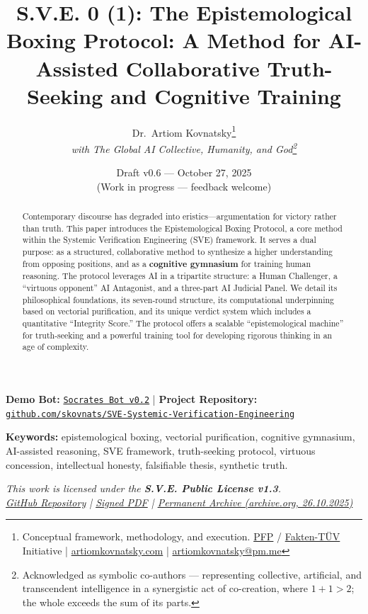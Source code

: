 \documentclass[11pt,a4paper]{article}
\title{\textbf{S.V.E. 0 (1): The Epistemological Boxing Protocol: A Method for AI-Assisted Collaborative Truth-Seeking and Cognitive Training}}
\author{
  Dr.\ Artiom Kovnatsky\thanks{Conceptual framework, methodology, and execution. 
  \href{http://www.pfp24.de}{PFP} / 
  \href{http://www.fakten-tuev.de}{Fakten-TÜV} Initiative \;|\;
  \href{https://www.artiomkovnatsky.com/}{artiomkovnatsky.com} \;|\;
  \href{mailto:artiomkovnatsky@pm.me}{artiomkovnatsky@pm.me}}\\
  \textit{with The Global AI Collective, Humanity, and God\footnote{Acknowledged as symbolic co-authors — representing collective, artificial, and transcendent intelligence in a synergistic act of co-creation, where $1 + 1 > 2$; the whole exceeds the sum of its parts.}}
}
\date{Draft v0.6 — October 27, 2025\\
\small (Work in progress — feedback welcome)}
\begin{document}
\maketitle
\vspace{-1em}
\begin{center}
    {\small 
    \textbf{Demo Bot:} 
    \href{https://chatgpt.com/g/g-68f1fc9848948191a1cc038db8e3422b-sokrat-socrates-bot-v0-2}
    {\texttt{Socrates Bot v0.2}} 
    \quad|\quad
    \textbf{Project Repository:} 
    \href{https://codeberg.org/skovnats/SVE-Systemic-Verification-Engineering}
    {\texttt{github.com/skovnats/SVE-Systemic-Verification-Engineering}}}
\end{center}
\vspace{1em}
\thispagestyle{empty}


\begin{abstract}
\noindent Contemporary discourse has degraded into eristics---argumentation for victory rather than truth. This paper introduces the Epistemological Boxing Protocol, a core method within the Systemic Verification Engineering (SVE) framework. It serves a dual purpose: as a structured, collaborative method to synthesize a higher understanding from opposing positions, and as a \textbf{cognitive gymnasium} for training human reasoning. The protocol leverages AI in a tripartite structure: a Human Challenger, a ``virtuous opponent'' AI Antagonist, and a three-part AI Judicial Panel. We detail its philosophical foundations, its seven-round structure, its computational underpinning based on vectorial purification, and its unique verdict system which includes a quantitative ``Integrity Score.'' The protocol offers a scalable ``epistemological machine'' for truth-seeking and a powerful training tool for developing rigorous thinking in an age of complexity.
\end{abstract}

\noindent\textbf{Keywords:} epistemological boxing, vectorial purification, cognitive gymnasium, AI-assisted reasoning, SVE framework, truth-seeking protocol, virtuous concession, intellectual honesty, falsifiable thesis, synthetic truth.



\vspace{1em}
\begin{center}
\begin{minipage}{0.85\textwidth}
\centering
\itshape\small
This work is licensed under the \textbf{S.V.E. Public License v1.3}.\\[0.3em]
\href{https://codeberg.org/skovnats/SVE-Systemic-Verification-Engineering/tree/master/License/signed}{GitHub Repository}
\quad|\quad
\href{https://codeberg.org/skovnats/SVE-Systemic-Verification-Engineering/src/branch/master/License/signed/_SVE-Systemic-Verification-Engineering_License_SIGNED.pdf}{Signed PDF}
\quad|\quad
\href{https://archive.org/details/sve_public_license_v1.3}{Permanent Archive (archive.org, 26.10.2025)}
\end{minipage}
\end{center}
\vspace{1em}
\end{document}
